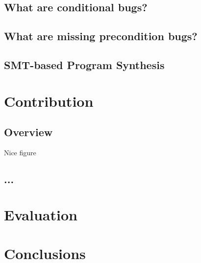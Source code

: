 \documentclass[a4paper,10pt,twocolumn]{article}
\begin{document}
\subsection{What are conditional bugs?}

\subsection{What are missing precondition bugs?}

\subsection{SMT-based Program Synthesis}


\section{Contribution}

\subsection{Overview}
Nice figure

\subsection{...}


\section{Evaluation}
\label{evaluation}

\section{Conclusions}
\label{conclusions}



\end{document}
